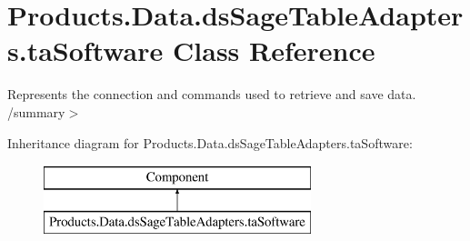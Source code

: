 \hypertarget{class_products_1_1_data_1_1ds_sage_table_adapters_1_1ta_software}{}\section{Products.\+Data.\+ds\+Sage\+Table\+Adapters.\+ta\+Software Class Reference}
\label{class_products_1_1_data_1_1ds_sage_table_adapters_1_1ta_software}


Represents the connection and commands used to retrieve and save data. /summary$>$  


Inheritance diagram for Products.\+Data.\+ds\+Sage\+Table\+Adapters.\+ta\+Software\+:\begin{figure}[H]
\begin{center}
\leavevmode
\includegraphics[height=2.000000cm]{class_products_1_1_data_1_1ds_sage_table_adapters_1_1ta_software}
\end{center}
\end{figure}
